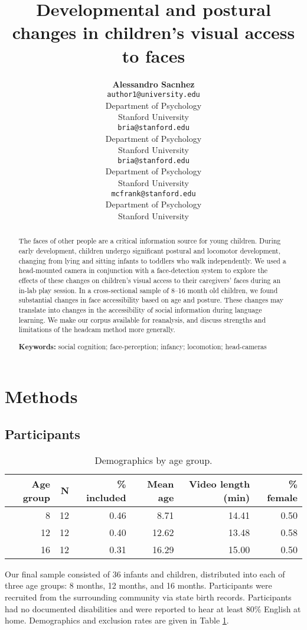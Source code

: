 \documentclass[10pt, letterpaper]{article}
\title{Developmental and postural changes in children's visual access to faces}
\author{{\large \bf Alessandro Sacnhez} \\ \texttt{author1@university.edu} \\ Department of Psychology \\ Stanford University \And {\large \bf Bria Long} \\ \texttt{bria@stanford.edu} \\ Department of Psychology \\ Stanford University
    \And {\large \bf Ally Kraus} \\ \texttt{bria@stanford.edu} \\ Department of Psychology \\ Stanford University
    \And {\large \bf Michael C. Frank} \\ \texttt{mcfrank@stanford.edu} \\ Department of Psychology \\ Stanford University}
\begin{document}
\maketitle

\begin{abstract}
The faces of other people are a critical information source for young
children. During early development, children undergo significant
postural and locomotor development, changing from lying and sitting
infants to toddlers who walk independently. We used a head-mounted
camera in conjunction with a face-detection system to explore the
effects of these changes on children's visual access to their
caregivers' faces during an in-lab play session. In a cross-sectional
sample of 8--16 month old children, we found substantial changes in face
accessibility based on age and posture. These changes may translate into
changes in the accessibility of social information during language
learning. We make our corpus available for reanalysis, and discuss
strengths and limitations of the headcam method more generally.

\textbf{Keywords:}
social cognition; face-perception; infancy; locomotion; head-cameras
\end{abstract}

\section{Methods}\label{methods}

\subsection{Participants}\label{participants}

\begin{table}[ht]
\centering
\begin{tabular}{rrrrrr}
  \hline
Age group & N & \% included & Mean age & Video length (min) & \% female \\ 
  \hline
   8 &  12 & 0.46 & 8.71 & 14.41 & 0.50 \\ 
   12 &  12 & 0.40 & 12.62 & 13.48 & 0.58 \\ 
   16 &  12 & 0.31 & 16.29 & 15.00 & 0.50 \\ 
   \hline
\end{tabular}
\caption{\label{tab:pop} Demographics by age group.}
\end{table}

Our final sample consisted of 36 infants and children, distributed into
each of three age groups: 8 months, 12 months, and 16 months.
Participants were recruited from the surrounding community via state
birth records. Participants had no documented disabilities and were
reported to hear at least 80\% English at home. Demographics and
exclusion rates are given in Table \ref{tab:pop}.
\end{document}
